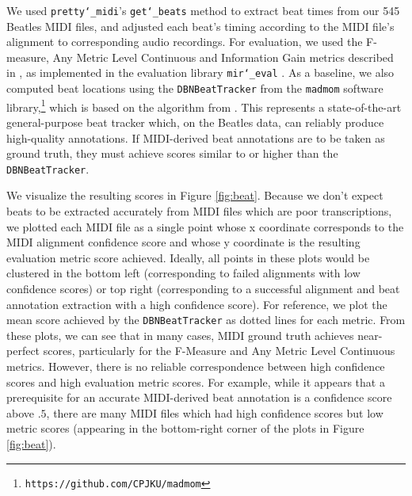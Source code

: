 \documentclass{article}
\begin{document}
We used \texttt{pretty\char`_midi}'s \texttt{get\char`_beats} method to extract beat times from our 545 Beatles MIDI files, and adjusted each beat's timing according to the MIDI file's alignment to corresponding audio recordings.
For evaluation, we used the F-measure, Any Metric Level Continuous and Information Gain metrics described in \cite{davies2009evaluation}, as implemented in the evaluation library \texttt{mir\char`_eval} \cite{raffel2014mir_eval}.
As a baseline, we also computed beat locations using the \texttt{DBNBeatTracker} from the \texttt{madmom} software library,\footnote{\texttt{https://github.com/CPJKU/madmom}} which is based on the algorithm from \cite{bock2014multi}.
This represents a state-of-the-art general-purpose beat tracker which, on the Beatles data, can reliably produce high-quality annotations.
If MIDI-derived beat annotations are to be taken as ground truth, they must achieve scores similar to or higher than the \texttt{DBNBeatTracker}.

We visualize the resulting scores in Figure \ref{fig:beat}.
Because we don't expect beats to be extracted accurately from MIDI files which are poor transcriptions, we plotted each MIDI file as a single point whose x coordinate corresponds to the MIDI alignment confidence score and whose y coordinate is the resulting evaluation metric score achieved.
Ideally, all points in these plots would be clustered in the bottom left (corresponding to failed alignments with low confidence scores) or top right (corresponding to a successful alignment and beat annotation extraction with a high confidence score).
For reference, we plot the mean score achieved by the \texttt{DBNBeatTracker} as dotted lines for each metric.
From these plots, we can see that in many cases, MIDI ground truth achieves near-perfect scores, particularly for the F-Measure and Any Metric Level Continuous metrics.
However, there is no reliable correspondence between high confidence scores and high evaluation metric scores.
For example, while it appears that a prerequisite for an accurate MIDI-derived beat annotation is a confidence score above $.5$, there are many MIDI files which had high confidence scores but low metric scores (appearing in the bottom-right corner of the plots in Figure \ref{fig:beat}).
\end{document}

